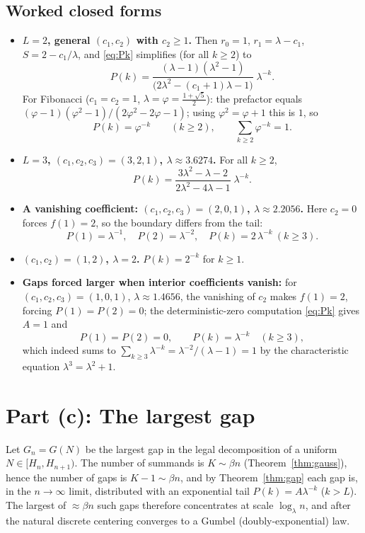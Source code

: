 \documentclass[12pt]{article}
\theoremstyle{definition}
\begin{document}
\subsection{Worked closed forms}
\begin{itemize}
\item \textbf{$L=2$, general $(c_1,c_2)$ with $c_2\ge1$.} Then $r_0=1$,
$r_1=\lambda-c_1$, $S=2-c_1/\lambda$, and \eqref{eq:Pk} simplifies (for all
$k\ge2$) to
\begin{equation}\label{eq:L2}
P(k)=\frac{(\lambda-1)(\lambda^2-1)}{\big(2\lambda^2-(c_1+1)\lambda-1\big)}\;\lambda^{-k}.
\end{equation}
For Fibonacci ($c_1=c_2=1$, $\lambda=\varphi=\frac{1+\sqrt5}{2}$): the prefactor
equals $(\varphi-1)(\varphi^2-1)/(2\varphi^2-2\varphi-1)$; using
$\varphi^2=\varphi+1$ this is $1$, so
\begin{equation}\label{eq:fib}
P(k)=\varphi^{-k}\qquad(k\ge2),\qquad \sum_{k\ge2}\varphi^{-k}=1.
\end{equation}
\item \textbf{$L=3$, $(c_1,c_2,c_3)=(3,2,1)$, $\lambda\approx3.6274$.}
For all $k\ge2$,
\[
P(k)=\frac{3\lambda^2-\lambda-2}{2\lambda^2-4\lambda-1}\;\lambda^{-k}.
\]
\item \textbf{A vanishing coefficient: $(c_1,c_2,c_3)=(2,0,1)$,
$\lambda\approx2.2056$.} Here $c_2=0$ forces $f(1)=2$, so the boundary differs
from the tail:
\[
P(1)=\lambda^{-1},\quad P(2)=\lambda^{-2},\quad P(k)=2\,\lambda^{-k}\ (k\ge3).
\]
\item \textbf{$(c_1,c_2)=(1,2)$, $\lambda=2$.} $P(k)=2^{-k}$ for $k\ge1$.
\item \textbf{Gaps forced larger when interior coefficients vanish:}
for $(c_1,c_2,c_3)=(1,0,1)$, $\lambda\approx1.4656$, the vanishing of $c_2$ makes
$f(1)=2$, forcing $P(1)=P(2)=0$; the deterministic-zero computation
\eqref{eq:Pk} gives $A=1$ and
\[
P(1)=P(2)=0,\qquad P(k)=\lambda^{-k}\quad(k\ge3),
\]
which indeed sums to $\sum_{k\ge3}\lambda^{-k}=\lambda^{-2}/(\lambda-1)=1$ by the
characteristic equation $\lambda^3=\lambda^2+1$.
\end{itemize}

\section{Part (c): The largest gap}\label{sec:c}

Let $G_n=G(N)$ be the largest gap in the legal decomposition of a uniform
$N\in[H_n,H_{n+1})$. The number of summands is $K\sim\beta n$
(Theorem~\ref{thm:gauss}), hence the number of gaps is $K-1\sim\beta n$, and by
Theorem~\ref{thm:gap} each gap is, in the $n\to\infty$ limit, distributed with an
exponential tail $P(k)=A\lambda^{-k}$ ($k>L$). The largest of $\approx\beta n$
such gaps therefore concentrates at scale $\log_\lambda n$, and after the natural
discrete centering converges to a Gumbel (doubly-exponential) law.
\end{document}
